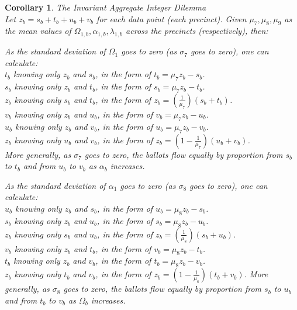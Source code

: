 \documentclass[preprint,13pt]{elsarticle}
\newtheorem{corollary}{Corollary}[theorem]
\begin{document}
\newpage
\begin{corollary}{The Invariant Aggregate Integer Dilemma}\\
Let $z_{b}=s_{b}+t_{b}+u_{b}+v_{b}$ for each data point (each precinct).
Given $\mu_{7}, \mu_{8}, \mu_{9}$ as the mean values of $\Omega_{1,b}, \alpha_{1,b}, \lambda_{1,b}$ across the precincts (respectively), then:

As the standard deviation of $\Omega_{1}$ goes to zero (as $\sigma_{7}$ goes to zero), one can calculate:\\
$t_{b}$ knowing only $z_{b}$ and $s_{b}$, in the form of $t_{b}=\mu_{7}z_{b}-s_{b}$.\\
$s_{b}$ knowing only $z_{b}$ and $t_{b}$, in the form of $s_{b}=\mu_{7}z_{b}-t_{b}$.\\
$z_{b}$ knowing only $s_{b}$ and $t_{b}$, in the form of $z_{b}=(\frac{1}{\mu_{7}})(s_{b}+t_{b})$.\\
$v_{b}$ knowing only $z_{b}$ and $u_{b}$, in the form of $v_{b}=\mu_{7}z_{b}-u_{b}$.\\
$u_{b}$ knowing only $z_{b}$ and $v_{b}$, in the form of $u_{b}=\mu_{7}z_{b}-v_{b}$.\\
$z_{b}$ knowing only $u_{b}$ and $v_{b}$, in the form of $z_{b}=(1-\frac{1}{\mu_{7}})(u_{b}+v_{b})$.\\
More generally, as  $\sigma_{7}$ goes to zero, the ballots flow equally by proportion from $s_{b}$ to $t_{b}$ and from $u_{b}$ to $v_{b}$ as $\alpha_{b}$ increases.

As the standard deviation of $\alpha_{1}$ goes to zero (as $\sigma_{8}$ goes to zero), one can calculate:\\
$u_{b}$ knowing only $z_{b}$ and $s_{b}$, in the form of $u_{b}=\mu_{8}z_{b}-s_{b}$.\\
$s_{b}$ knowing only $z_{b}$ and $u_{b}$, in the form of $s_{b}=\mu_{8}z_{b}-u_{b}$.\\
$z_{b}$ knowing only $s_{b}$ and $u_{b}$, in the form of $z_{b}=(\frac{1}{\mu_{8}})(s_{b}+u_{b})$.\\
$v_{b}$ knowing only $z_{b}$ and $t_{b}$, in the form of $v_{b}=\mu_{8}z_{b}-t_{b}$.\\
$t_{b}$ knowing only $z_{b}$ and $v_{b}$, in the form of $t_{b}=\mu_{8}z_{b}-v_{b}$.\\
$z_{b}$ knowing only $t_{b}$ and $v_{b}$, in the form of $z_{b}=(1-\frac{1}{\mu_{8}})(t_{b}+v_{b})$.
More generally, as  $\sigma_{8}$ goes to zero, the ballots flow equally by proportion from $s_{b}$ to $u_{b}$ and from $t_{b}$ to $v_{b}$ as $\Omega_{b}$ increases.


\end{corollary}
\end{document}
